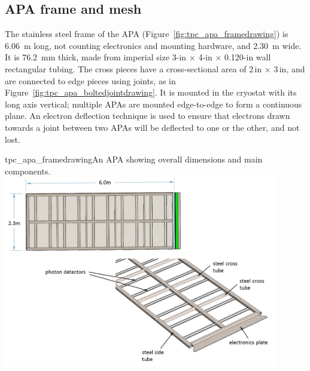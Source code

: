 \subsection{APA frame and mesh}
\label{subsec:apa_frame}


The stainless steel frame of the APA (Figure~\ref{fig:tpc_apa_framedrawing}) is 6.06~m long, not counting electronics and mounting hardware, and 2.30~m wide.  It is 76.2~mm thick, made from imperial size 3-in $\times$ 4-in $\times$ 0.120-in wall rectangular tubing.  The cross pieces have a cross-sectional area of 2\,in $\times$ 3\,in, and are connected to edge pieces using joints, as in Figure~\ref{fig:tpc_apa_boltedjointdrawing}.  It is mounted in the cryostat with its long axis vertical; multiple APAs are mounted edge-to-edge to form a continuous plane. An electron deflection technique is used to ensure that electrons drawn towards a joint between two APAs will be deflected to one or the other, and not lost.


\begin{cdrfigure}{tpc_apa_framedrawing}{An APA showing overall dimensions and main components. }
\includegraphics[width=0.9\textwidth]{figures/tpc_apa_framedrawing.png} 
\end{cdrfigure}

